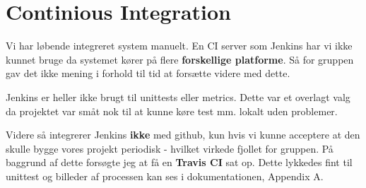 \section{Continious Integration}\label{sec:ci}

Vi har løbende integreret system manuelt. En CI server som Jenkins har vi ikke kunnet bruge da systemet kører på flere \textbf{forskellige platforme}. Så for gruppen gav det ikke mening i forhold til tid at forsætte videre med dette.

Jenkins er heller ikke brugt til unittests eller metrics. Dette var et overlagt valg da projektet var småt nok til at kunne køre test mm. lokalt uden problemer.

Videre så integrerer Jenkins \textbf{ikke} med github, kun hvis vi kunne acceptere at den skulle bygge vores projekt periodisk - hvilket virkede fjollet for gruppen. 
På baggrund af dette forsøgte jeg at få en \textbf{Travis CI} sat op. Dette lykkedes fint til unittest og billeder af processen kan ses i dokumentationen, Appendix A.